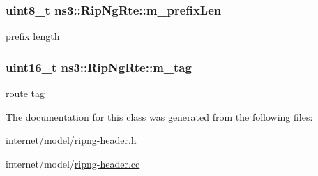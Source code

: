 \subsubsection[{\texorpdfstring{m\+\_\+prefix\+Len}{m_prefixLen}}]{\setlength{\rightskip}{0pt plus 5cm}uint8\+\_\+t ns3\+::\+Rip\+Ng\+Rte\+::m\+\_\+prefix\+Len\hspace{0.3cm}{\ttfamily [private]}}\hypertarget{classns3_1_1RipNgRte_a39a5934e2e8344da996921c744daf2e9}{}\label{classns3_1_1RipNgRte_a39a5934e2e8344da996921c744daf2e9}


prefix length 

\subsubsection[{\texorpdfstring{m\+\_\+tag}{m_tag}}]{\setlength{\rightskip}{0pt plus 5cm}uint16\+\_\+t ns3\+::\+Rip\+Ng\+Rte\+::m\+\_\+tag\hspace{0.3cm}{\ttfamily [private]}}\hypertarget{classns3_1_1RipNgRte_a02e9a9a0a844f09441d19418c434acf6}{}\label{classns3_1_1RipNgRte_a02e9a9a0a844f09441d19418c434acf6}


route tag 



The documentation for this class was generated from the following files\+:\begin{DoxyCompactItemize}
\item 
internet/model/\hyperlink{ripng-header_8h}{ripng-\/header.\+h}\item 
internet/model/\hyperlink{ripng-header_8cc}{ripng-\/header.\+cc}\end{DoxyCompactItemize}
